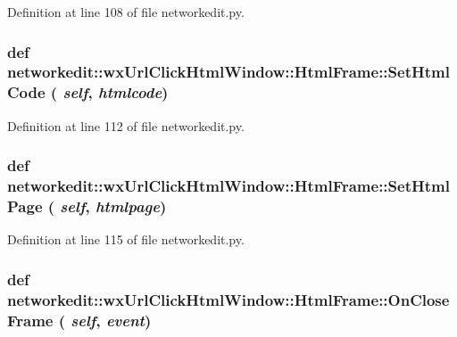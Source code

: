 Definition at line 108 of file networkedit.py.\hypertarget{classnetworkedit_1_1wxUrlClickHtmlWindow_1_1HtmlFrame_0d46d44545dff5c49ee702dce0ca58a7}{
\subsubsection[SetHtmlCode]{\setlength{\rightskip}{0pt plus 5cm}def networkedit::wx\-Url\-Click\-Html\-Window::Html\-Frame::Set\-Html\-Code ( {\em self},  {\em htmlcode})}}
\label{classnetworkedit_1_1wxUrlClickHtmlWindow_1_1HtmlFrame_0d46d44545dff5c49ee702dce0ca58a7}




Definition at line 112 of file networkedit.py.\hypertarget{classnetworkedit_1_1wxUrlClickHtmlWindow_1_1HtmlFrame_4facc9fa00032db7ca18302a09300a15}{
\subsubsection[SetHtmlPage]{\setlength{\rightskip}{0pt plus 5cm}def networkedit::wx\-Url\-Click\-Html\-Window::Html\-Frame::Set\-Html\-Page ( {\em self},  {\em htmlpage})}}
\label{classnetworkedit_1_1wxUrlClickHtmlWindow_1_1HtmlFrame_4facc9fa00032db7ca18302a09300a15}




Definition at line 115 of file networkedit.py.\hypertarget{classnetworkedit_1_1wxUrlClickHtmlWindow_1_1HtmlFrame_300490430ca9c68ffff6f1ce4f9cff66}{
\subsubsection[OnCloseFrame]{\setlength{\rightskip}{0pt plus 5cm}def networkedit::wx\-Url\-Click\-Html\-Window::Html\-Frame::On\-Close\-Frame ( {\em self},  {\em event})}}
\label{classnetworkedit_1_1wxUrlClickHtmlWindow_1_1HtmlFrame_300490430ca9c68ffff6f1ce4f9cff66}




